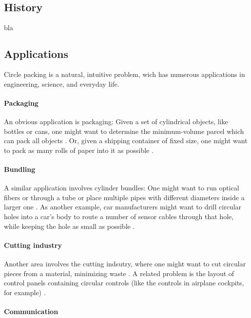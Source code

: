 \documentclass[a4paper,style=print,bibliography=totoc,nexus,lnum,extramargin]{tubsbook}
\begin{document}
\subsection{History}

bla

\subsection{Applications}

Circle packing is a natural, intuitive problem, wich has numerous applications in engineering, science, and everyday life.

\paragraph{Packaging}

An obvious application is packaging: Given a set of cylindrical objects, like bottles or cans, one might want to determine the minimum-volume parcel which can pack all objects \parencite{CKP2008solving}. Or, given a shipping container of fixed size, one might want to pack as many rolls of paper into it as possible \parencite{fraser1994integrated}.

\paragraph{Bundling}

A similar application involves cylinder bundles:
One might want to run optical fibers or through a tube or place multiple pipes with different diameters inside a larger one \parencite{WHZX2002improved}. As another example, car manufacturers might want to drill circular holes into a car's body to route a number of sensor cables through that hole, while keeping the hole as small as possible \cite{SSSKK2004disk}.

\paragraph{Cutting industry}

Another area involves the cutting indsutry, where one might want to cut circular pieces from a material, minimizing waste \cite{SMCSCG2007new}.
A related problem is the layout of control panels containing circular controls (like the controls in airplane cockpits, for example) \parencite{CKP2008solving}.

\paragraph{Communication}
\end{document}
